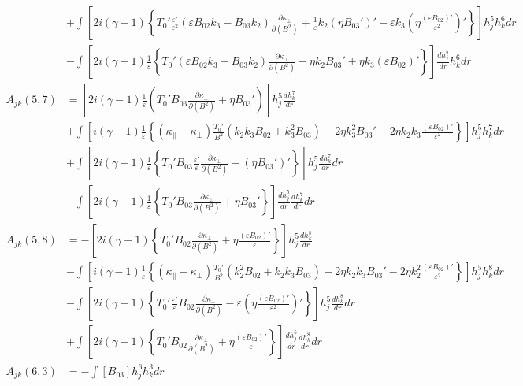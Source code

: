 \documentclass[11pt, fleqn]{article}
\newcommand{\eps}{\varepsilon}
\begin{document}
\begin{align*}
				 &+  \int\left[2i(\gamma-1)\left\{T_0'\frac{\eps'}{\eps^2}(\eps B_{02}k_3 - B_{03}k_2)\frac{\partial\kappa_\bot}{\partial(B^2)} + \frac{1}{\eps}k_2(\eta B_{03}')' 
				 										- \eps k_3\left(\eta \frac{(\eps B_{02})'}{\eps^2}\right)'\right\}\right] h_j^5 h_k^6 dr																										\\
				 &-  \int\left[2i(\gamma-1)\frac{1}{\eps}\left\{T_0'(\eps B_{02}k_3 - B_{03}k_2)\frac{\partial\kappa_\bot}{\partial(B^2)} - \eta k_2B_{03}' + \eta k_3(\eps B_{02})' \right\}\right] \frac{dh_j^5}{dr}h_k^6 dr							\\[10pt]
	A_{jk}(5, 7) &=  \left[2i(\gamma-1)\frac{1}{\eps}\left(T_0'B_{03}\frac{\partial\kappa_\bot}{\partial(B^2)} + \eta B_{03}'\right)\right] h_j^5 \frac{dh_k^7}{dr}																						\\
				 &+  \int\left[i(\gamma-1)\frac{1}{\eps}\left\{(\kappa_\parallel - \kappa_\bot)\frac{T_0'}{B^2}(k_2k_3B_{02} + k_3^2B_{03}) - 2\eta k_3^2 B_{03}' - 2\eta k_2k_3\frac{(\eps B_{02})'}{\eps^2}\right\}\right] h_j^5 h_k^7 dr				\\
				 &+  \int\left[2i(\gamma-1)\frac{1}{\eps}\left\{T_0'B_{03}\frac{\eps'}{\eps}\frac{\partial\kappa_\bot}{\partial(B^2)} - (\eta B_{03}')'\right\}\right] h_j^5 \frac{dh_k^7}{dr} dr														\\
				 &-  \int\left[2i(\gamma-1)\frac{1}{\eps}\left\{T_0'B_{03}\frac{\partial\kappa_\bot}{\partial(B^2)} + \eta B_{03}'\right\}\right] \frac{dh_j^5}{dr}\frac{dh_k^7}{dr} dr																	\\
	A_{jk}(5, 8) &=  -\left[2i(\gamma-1)\left\{T_0' B_{02}\frac{\partial\kappa_\bot}{\partial(B^2)} + \eta\frac{(\eps B_{02})'}{\eps}\right\}\right] h_j^5 \frac{dh_k^8}{dr}																			\\
				 &-  \int\left[i(\gamma-1)\frac{1}{\eps}\left\{(\kappa_\parallel - \kappa_\bot)\frac{T_0'}{B^2}(k_2^2 B_{02} + k_2k_3B_{03}) - 2\eta k_2k_3B_{03}' - 2\eta k_2^2\frac{(\eps B_{02})'}{\eps^2}\right\}\right] h_j^5 h_k^8 dr				\\
				 &-  \int\left[2i(\gamma-1)\left\{T_0'\frac{\eps'}{\eps}B_{02}\frac{\partial\kappa_\bot}{\partial(B^2)} - \eps\left(\eta\frac{(\eps B_{02})'}{\eps^2}\right)'\right\}\right]h_j^5 \frac{dh_k^8}{dr} dr									\\
				 &+  \int\left[2i(\gamma-1)\left\{T_0' B_{02}\frac{\partial\kappa_\bot}{\partial(B^2)} + \eta\frac{(\eps B_{02})'}{\eps}\right\}\right] \frac{dh_j^5}{dr}\frac{dh_k^8}{dr} dr															\\
	A_{jk}(6, 3) &= -\int \left[B_{03}\right] h_j^6 h_k^3 dr								\\

\end{align*}
\end{document}

